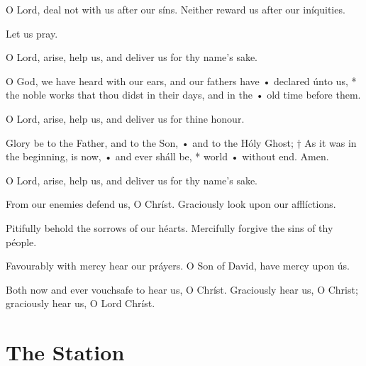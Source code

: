 \V O Lord, deal not with us after our síns.  \R Neither reward us after our iníquities.

\centerline{Let us pray.}



\ant O Lord, arise, help us, and deliver us for thy name’s sake.

\V O God, we have heard with our ears, and our fathers have • declared únto us, * the noble works that thou didst in their days, and in the • old time before them.

\ant O Lord, arise, help us, and deliver us for thine honour.

\V Glory be to the Father, and to the Son, • and to the Hóly Ghost; † As it was in the beginning, is now, • and ever sháll be, * world • without end. Amen.

\ant O Lord, arise, help us, and deliver us for thy name’s sake.


\V From our enemies defend us, O Chríst.  \R Graciously look upon our afflíctions.

\V Pitifully behold the sorrows of our héarts.  \R Mercifully forgive the sins of thy péople.

\V Favourably with mercy hear our práyers.  \R O Son of David, have mercy upon ús.

\V Both now and ever vouchsafe to hear us, O Chríst.  \R Graciously hear us, O Christ; graciously hear us, O Lord Chríst.


\section{The Station}
\label{litanyStation}

